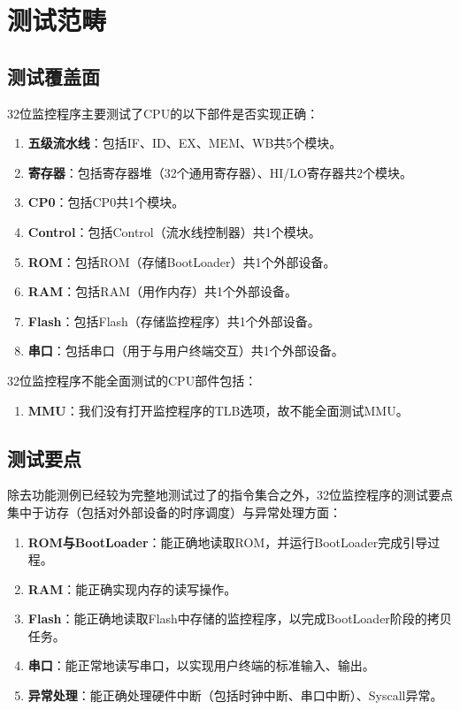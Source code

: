 \section{测试范畴}

\subsection{测试覆盖面}


32位监控程序主要测试了CPU的以下部件是否实现正确：

\begin{enumerate}
    \item {\bf 五级流水线}：包括IF、ID、EX、MEM、WB共5个模块。
    \item {\bf 寄存器}：包括寄存器堆（32个通用寄存器）、HI/LO寄存器共2个模块。
    \item {\bf CP0}：包括CP0共1个模块。
    \item {\bf Control}：包括Control（流水线控制器）共1个模块。
    \item {\bf ROM}：包括ROM（存储BootLoader）共1个外部设备。
    \item {\bf RAM}：包括RAM（用作内存）共1个外部设备。
    \item {\bf Flash}：包括Flash（存储监控程序）共1个外部设备。
    \item {\bf 串口}：包括串口（用于与用户终端交互）共1个外部设备。
\end{enumerate}

32位监控程序不能全面测试的CPU部件包括：

\begin{enumerate}
    \item {\bf MMU}：我们没有打开监控程序的TLB选项，故不能全面测试MMU。
\end{enumerate}

\subsection{测试要点}

除去功能测例已经较为完整地测试过了的指令集合之外，32位监控程序的测试要点集中于访存（包括对外部设备的时序调度）与异常处理方面：

\begin{enumerate}
    \item {\bf ROM与BootLoader}：能正确地读取ROM，并运行BootLoader完成引导过程。
    \item {\bf RAM}：能正确实现内存的读写操作。
    \item {\bf Flash}：能正确地读取Flash中存储的监控程序，以完成BootLoader阶段的拷贝任务。
    \item {\bf 串口}：能正常地读写串口，以实现用户终端的标准输入、输出。
    \item {\bf 异常处理}：能正确处理硬件中断（包括时钟中断、串口中断）、Syscall异常。
\end{enumerate}

